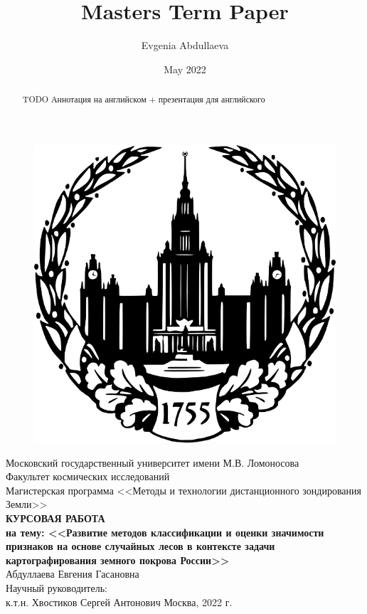 \documentclass[14pt, a4paper, oneside]{extarticle}
\title{Masters Term Paper}
\author{Evgenia Abdullaeva}
\date{May 2022}
\begin{document}
\begin{titlepage}
    \centering
        \begin{figure}[H]
            \centering
            \includegraphics[scale=1.6]{msu-logo}
        \end{figure}
        Московский государственный университет имени М.В. Ломоносова\\
        \vspace{0.5cm}
        Факультет космических исследований\\
        Магистерская программа <<Методы и технологии дистанционного зондирования Земли>>\\
        \vfill
        \textbf{КУРСОВАЯ РАБОТА\\
        на тему: <<Развитие методов классификации и оценки значимости признаков на основе случайных лесов в контексте задачи картографирования земного покрова России>>}\\
        \vfill
        Абдуллаева Евгения Гасановна\\
        \vspace{0.5cm}
        Научный руководитель:\\
        к.т.н. Хвостиков Сергей Антонович
        \vfill
        Москва, 2022 г.
\end{titlepage}

\begin{abstract}
TODO Аннотация на английском + презентация для английского
\end{abstract}
\begin{abstract}

\end{abstract}
\setcounter{page}{2}
\newpage
\end{document}
